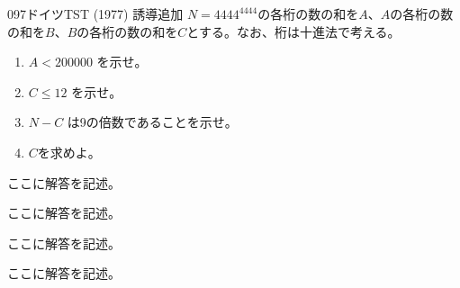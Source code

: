 \begin{prob}{097}{}{ドイツTST (1977) 誘導追加}
 $N=4444^{4444}$の各桁の数の和を$A$、$A$の各桁の数の和を$B$、$B$の各桁の数の和を$C$とする。なお、桁は十進法で考える。
 \begin{enumerate}
  \item $A<200000$ を示せ。
  \item $C\le 12$ を示せ。
  \item $N-C$ は9の倍数であることを示せ。
  \item $C$を求めよ。
 \end{enumerate}
\end{prob}
ここに解答を記述。

ここに解答を記述。

ここに解答を記述。

ここに解答を記述。